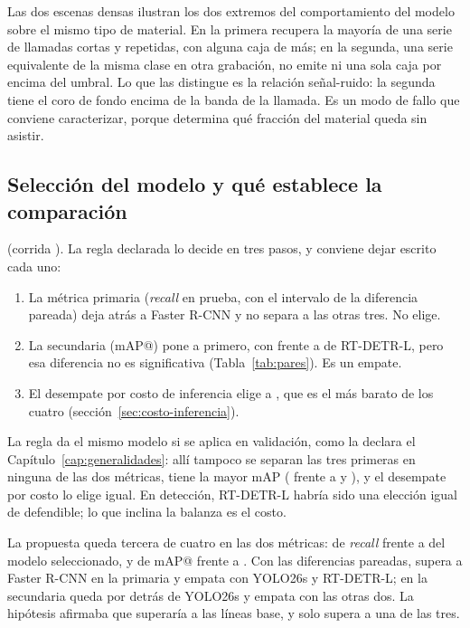 Las dos escenas densas ilustran los dos extremos del comportamiento del modelo
sobre el mismo tipo de material. En la primera recupera la mayoría de una serie
de llamadas cortas y repetidas, con alguna caja de más; en la segunda, una serie
equivalente de la misma clase en otra grabación, no emite ni una sola caja por
encima del umbral. Lo que las distingue es la
relación señal-ruido: la segunda tiene el coro de fondo encima de la banda de la
llamada. Es un modo de fallo que conviene caracterizar, porque determina qué
fracción del material queda sin asistir.

\subsection{Selección del modelo y qué establece la comparación}
\label{sec:seleccion-modelo}

 (corrida \rWinnerRun{}). La
regla declarada lo decide en tres pasos, y conviene dejar escrito cada uno:

\begin{enumerate}[nosep]
    \item La métrica primaria (\textit{recall} en prueba, con el intervalo de la
          diferencia pareada) deja atrás a Faster R-CNN y no separa a las otras
          tres. No elige.
    \item La secundaria (mAP@\pMatchIou{}) pone a \rBestSecondary{} primero, con
          \rMapYol{} frente a \rMapRtd{} de RT-DETR-L, pero esa diferencia no es
          significativa (Tabla~\ref{tab:pares}). Es un empate.
    \item El desempate por costo de inferencia elige a \rBestSecondary{}, que es
          el más barato de los cuatro (sección~\ref{sec:costo-inferencia}).
\end{enumerate}

La regla da el mismo modelo si se aplica en validación, como la declara el
Capítulo~\ref{cap:generalidades}: allí tampoco se separan las tres primeras en
ninguna de las dos métricas, \rBestSecondary{} tiene la mayor mAP
(\rMapValYol{} frente a \rMapValRtd{} y \rMapValDet{}), y el desempate por costo
lo elige igual. En detección, RT-DETR-L habría sido una elección igual de
defendible; lo que inclina la balanza es el costo.

 La propuesta queda tercera de
cuatro en las dos métricas: \rRecallDet{} de \textit{recall} frente a
\rRecallYol{} del modelo seleccionado, y \rMapDet{} de mAP@\pMatchIou{} frente a
\rMapYol{}. Con las diferencias pareadas, supera a Faster R-CNN en la primaria y
empata con YOLO26s y RT-DETR-L; en la secundaria queda por detrás de YOLO26s y
empata con las otras dos. La hipótesis afirmaba que superaría a las líneas base,
y solo supera a una de las tres.

